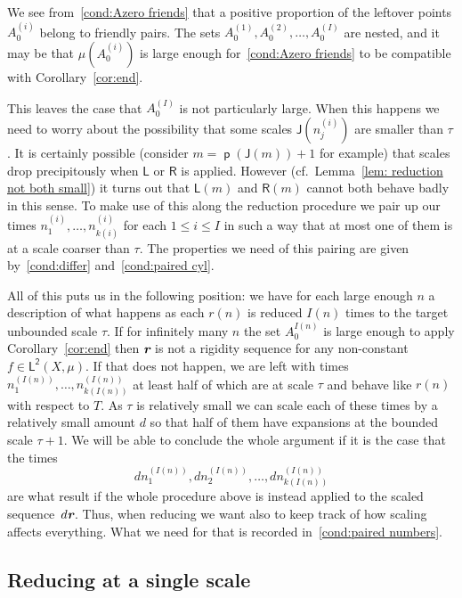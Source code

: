 \documentclass[AHL,Unicode,longabstracts,published]{cedram}
\DeclareMathOperator{\p}{\mathsf{p}}
\newcommand{\lp}{\mathsf{L}}
\newcommand{\ltwo}{\lp^{\!\mathsf{2}}}
\newcommand{\lft}{\mathsf{L}}
\newcommand{\rht}{\mathsf{R}}
\newcommand{\scl}{\mathsf{J}}
\def\mathbi#1{\textbf{\em #1}}
\newcommand{\bir}{\mathbi{r}}
\begin{document}
We see from~\eqref{cond:Azero friends} that a positive proportion of the leftover points $A^{(i)}_0$ belong to friendly pairs. The sets $A^{(1)}_0,A^{(2)}_0,\dots,A^{(I)}_0$ are nested, and it may be that $\mu(A^{(i)}_0)$ is large enough for~\ref{cond:Azero friends} to be compatible with Corollary~\ref{cor:end}.

This leaves the case that $A^{(I)}_0$ is not particularly large. When this happens we need to worry about the possibility that some scales $\scl(n^{(i)}_j)$ are smaller than $\tau$. It is certainly possible (consider $m = \p(\scl(m))+1$ for example) that scales drop precipitously when $\lft$ or $\rht$ is applied. However (cf.\ Lemma~\ref{lem: reduction not both small}) it turns out that $\lft(m)$ and $\rht(m)$ cannot both behave badly in this sense. To make use of this along the reduction procedure we pair up our times $n^{(i)}_1,\dots,n^{(i)}_{k(i)}$ for each $1 \le i \le I$ in such a way that at most one of them is at a scale coarser than $\tau$. The properties we need of this pairing are given by~\eqref{cond:differ} and~\eqref{cond:paired cyl}.

All of this puts us in the following position: we have for each large enough $n$ a description of what happens as each $r(n)$ is reduced $I(n)$ times to the target unbounded scale $\tau$. If for infinitely many $n$ the set $A^{I(n)}_0$ is large enough to apply Corollary~\ref{cor:end} then $ \bir$ is not a rigidity sequence for any non-constant $f \in
\ltwo(X,\mu)$. If that does not happen, we are left with times $n^{(I(n))}_1,\dots,n^{(I(n))}_{k(I(n))}$ at least half of which are at scale $\tau$ and behave like $r(n)$ with respect to $T$. As $\tau$ is relatively small we can scale each of these times by a relatively small amount $d$ so that half of them have expansions at the bounded scale $\tau+1$. We will be able to conclude the whole argument if it is the case that the times
\[
d n^{(I(n))}_1,d n^{(I(n))}_2,\dots,d n^{(I(n))}_{k(I(n))}
\]
are what result if the whole procedure above is instead applied to the scaled sequence~$d  \bir$. Thus, when reducing we want also to keep track of how scaling affects everything. What we need for that is recorded in~\eqref{cond:paired numbers}.




\subsection{Reducing at a single scale}\label{subsec:reduction once}
\end{document}
